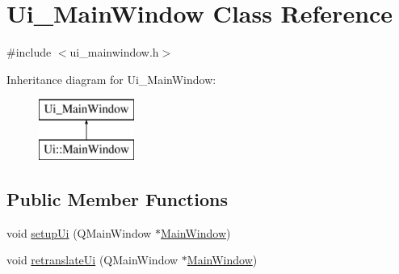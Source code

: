 \hypertarget{class_ui___main_window}{}\section{Ui\+\_\+\+Main\+Window Class Reference}
\label{class_ui___main_window}


{\ttfamily \#include $<$ui\+\_\+mainwindow.\+h$>$}

Inheritance diagram for Ui\+\_\+\+Main\+Window\+:\begin{figure}[H]
\begin{center}
\leavevmode
\includegraphics[height=2.000000cm]{class_ui___main_window}
\end{center}
\end{figure}
\subsection*{Public Member Functions}
\begin{DoxyCompactItemize}
\item 
void \mbox{\hyperlink{class_ui___main_window_acf4a0872c4c77d8f43a2ec66ed849b58}{setup\+Ui}} (Q\+Main\+Window $\ast$\mbox{\hyperlink{class_main_window}{Main\+Window}})
\item 
void \mbox{\hyperlink{class_ui___main_window_a097dd160c3534a204904cb374412c618}{retranslate\+Ui}} (Q\+Main\+Window $\ast$\mbox{\hyperlink{class_main_window}{Main\+Window}})
\end{DoxyCompactItemize}
